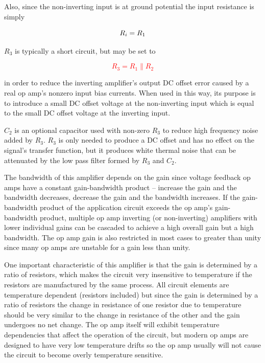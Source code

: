 Also, since the non-inverting input is at ground potential the input resistance is simply

\textcolor{red}{
\begin{equation}
R_i = R_1
\end{equation}
}

$R_{3}$ is typically a short circuit, but may be set to

\textcolor{red}{
\begin{equation}
R_3 = R_1 \parallel R_2
\end{equation}
}

in order to reduce the inverting amplifier's output DC offset error caused by a real op amp's nonzero input bias currents.
When used in this way, its purpose is to introduce a small DC offset voltage at the non-inverting input which is equal to the small DC offset voltage at the inverting input.

$C_2$ is an optional capacitor used with non-zero $R_3$ to reduce high frequency noise added by $R_3$.
$R_3$ is only needed to produce a DC offset and has no effect on the signal's transfer function, but it produces white thermal noise that can be attenuated by the low pass filter formed by $R_3$ and $C_2$.

The bandwidth of this amplifier depends on the gain since voltage feedback op amps have a constant gain-bandwidth product -- increase the gain and the bandwidth decreases, decrease the gain and the bandwidth increases.
If the gain-bandwidth product of the application circuit exceeds the op amp's gain-bandwidth product, multiple op amp inverting (or non-inverting) amplifiers with lower individual gains can be cascaded to achieve a high overall gain but a high bandwidth.
The op amp gain is also restricted in most cases to greater than unity since many op amps are unstable for a gain less than unity.

One important characteristic of this amplifier is that the gain is determined by a ratio of resistors, which makes the circuit very insensitive to temperature if the resistors are manufactured by the same process.
All circuit elements are temperature dependent (resistors included) but since the gain is determined by a ratio of resistors the change in resistance of one resistor due to temperature should be very similar to the change in resistance of the other and the gain undergoes no net change.
The op amp itself will exhibit temperature dependencies that affect the operation of the circuit, but modern op amps are designed to have very low temperature drifts so the op amp usually will not cause the circuit to become overly temperature sensitive.

